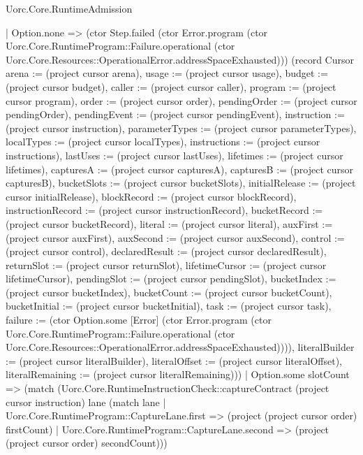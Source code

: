 \begin{lexlean}{Uorc.Core.RuntimeAdmission}
\begin{semanticmodule}
{              | Option.none => (ctor Step.failed (ctor Error.program (ctor Uorc.Core.RuntimeProgram::Failure.operational (ctor Uorc.Core.Resources::OperationalError.addressSpaceExhausted))) (record Cursor {arena := (project cursor arena), usage := (project cursor usage), budget := (project cursor budget), caller := (project cursor caller), program := (project cursor program), order := (project cursor order), pendingOrder := (project cursor pendingOrder), pendingEvent := (project cursor pendingEvent), instruction := (project cursor instruction), parameterTypes := (project cursor parameterTypes), localTypes := (project cursor localTypes), instructions := (project cursor instructions), lastUses := (project cursor lastUses), lifetimes := (project cursor lifetimes), capturesA := (project cursor capturesA), capturesB := (project cursor capturesB), bucketSlots := (project cursor bucketSlots), initialRelease := (project cursor initialRelease), blockRecord := (project cursor blockRecord), instructionRecord := (project cursor instructionRecord), bucketRecord := (project cursor bucketRecord), literal := (project cursor literal), auxFirst := (project cursor auxFirst), auxSecond := (project cursor auxSecond), control := (project cursor control), declaredResult := (project cursor declaredResult), returnSlot := (project cursor returnSlot), lifetimeCursor := (project cursor lifetimeCursor), pendingSlot := (project cursor pendingSlot), bucketIndex := (project cursor bucketIndex), bucketCount := (project cursor bucketCount), bucketInitial := (project cursor bucketInitial), task := (project cursor task), failure := (ctor Option.some [Error] (ctor Error.program (ctor Uorc.Core.RuntimeProgram::Failure.operational (ctor Uorc.Core.Resources::OperationalError.addressSpaceExhausted)))), literalBuilder := (project cursor literalBuilder), literalOffset := (project cursor literalOffset), literalRemaining := (project cursor literalRemaining)}))
              | Option.some slotCount => (match (Uorc.Core.RuntimeInstructionCheck::captureContract (project cursor instruction) lane (match lane
                  | Uorc.Core.RuntimeProgram::CaptureLane.first => (project (project cursor order) firstCount)
                  | Uorc.Core.RuntimeProgram::CaptureLane.second => (project (project cursor order) secondCount)))
}
\end{semanticmodule}
\end{lexlean}
